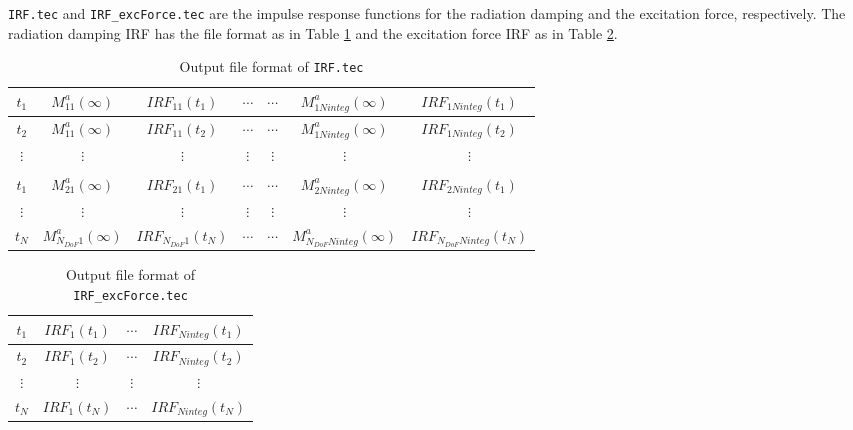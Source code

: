 \documentclass[12pt,a4paper,titlepage]{article}
\begin{document}
\noindent
\texttt{IRF.tec} and \texttt{IRF\_excForce.tec} are the impulse response functions for the radiation damping and the excitation force, respectively. The radiation damping IRF has the file format as in Table \ref{tab:IRF} and the excitation force IRF as in Table \ref{tab:IRFExcF}.\\

\begin{table}[ht]
\begin{center}
\caption{Output file format of \texttt{IRF.tec}}\label{tab:IRF}
\begin{tabular}{ccccccc}
\hline
$t_1$ & $M^a_{11}(\infty)$ &$IRF_{11}(t_1)$ & $\cdots$ & $\cdots$ & $M^a_{1Ninteg}(\infty)$ &$IRF_{1Ninteg}(t_1)$ \\
\hline
$t_2$ & $M^a_{11}(\infty)$ &$IRF_{11}(t_2)$ & $\cdots$ & $\cdots$ & $M^a_{1Ninteg}(\infty)$ &$IRF_{1Ninteg}(t_2)$ \\
\hline
$\vdots$& $\vdots$ & $\vdots$ & $\vdots$ &$\vdots$ &$\vdots$  &$\vdots$\\
\hline
&&& & &&\\
\hline
$t_1$ & $M^a_{21}(\infty)$ &$IRF_{21}(t_1)$ & $\cdots$ & $\cdots$ & $M^a_{2Ninteg}(\infty)$ &$IRF_{2Ninteg}(t_1)$ \\
\hline
$\vdots$& $\vdots$ & $\vdots$ & $\vdots$ &$\vdots$ &$\vdots$  &$\vdots$\\
\hline
$t_N$ & $M^a_{N_{DoF}1}(\infty)$ &$IRF_{N_{DoF}1}(t_N)$ & $\cdots$ & $\cdots$ & $M^a_{N_{DoF}Ninteg}(\infty)$ &$IRF_{N_{DoF}Ninteg}(t_N)$ \\
\hline
\end{tabular}
\end{center}
\end{table}

\begin{table}[ht]
\begin{center}
\caption{Output file format of \texttt{IRF\_excForce.tec}}\label{tab:IRFExcF}
\begin{tabular}{cccc}
\hline
$t_1$ &$IRF_{1}(t_1)$ & $\cdots$ &$IRF_{Ninteg}(t_1)$ \\
\hline
$t_2$ &$IRF_{1}(t_2)$ & $\cdots$ &$IRF_{Ninteg}(t_2)$ \\
\hline
$\vdots$& $\vdots$ & $\vdots$ & $\vdots$ \\
\hline
$t_N$ &$IRF_{1}(t_N)$ & $\cdots$ &$IRF_{Ninteg}(t_N)$ \\
\hline
\end{tabular}
\end{center}
\end{table}
\end{document}
